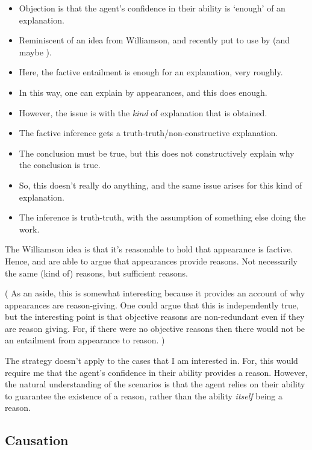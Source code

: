 \documentclass[10pt]{article}
\begin{document}
\begin{itemize}
\item Objection is that the agent's confidence in their ability is `enough' of an explanation.
\item Reminiscent of an idea from Williamson, and recently put to use by \citeauthor{Lord:2018aa} (and maybe \citeauthor{Kiesewetter:2017aa}).
\item Here, the factive entailment is enough for an explanation, very roughly.
\item In this way, one can explain by appearances, and this does enough.
\item However, the issue is with the \emph{kind} of explanation that is obtained.
\item The factive inference gets a truth-truth/non-constructive explanation.
\item The conclusion must be true, but this does not constructively explain why the conclusion is true.
\item So, this doesn't really do anything, and the same issue arises for this kind of explanation.
\item The inference is truth-truth, with the assumption of something else doing the work.
\end{itemize}

\begin{note}
The Williamson idea is that it's reasonable to hold that appearance is factive.
Hence, \citeauthor[Ch.\ 7]{Lord:2018aa} and \citeauthor{Kiesewetter:2017aa} are able to argue that appearances provide reasons.
Not necessarily the same (kind of) reasons, but sufficient reasons.

(
As an aside, this is somewhat interesting because it provides an account of why appearances are reason-giving.
One could argue that this is independently true, but the interesting point is that objective reasons are non-redundant even if they are reason giving.
For, if there were no objective reasons then there would not be an entailment from appearance to reason.
)

The strategy doesn't apply to the cases that I am interested in.
For, this would require me that the agent's confidence in their ability provides a reason.
However, the natural understanding of the scenarios is that the agent relies on their ability to guarantee the existence of a reason, rather than the ability \emph{itself} being a reason.
\end{note}

\subsection{Causation}
\label{sec:causation}
\end{document}
